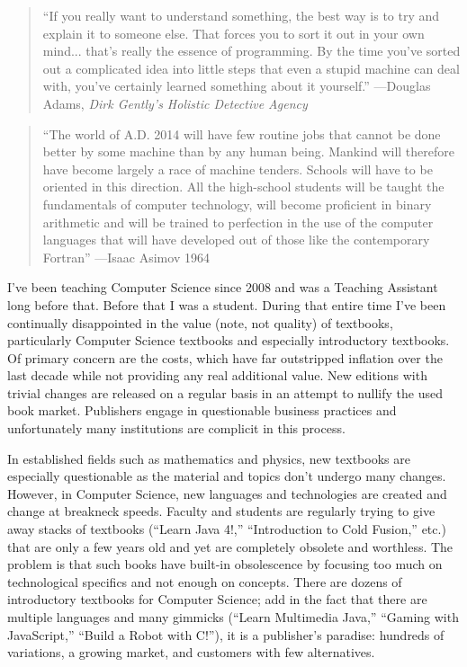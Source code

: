 
\begin{quote}
``If you really want to understand something, the best way is to try and explain it to someone else. That forces you to sort it out in your own mind... that's really the essence of programming. By the time you've sorted out a complicated idea into little steps that even a stupid machine can deal with, you've certainly learned something about it yourself.'' ---Douglas Adams, \emph{Dirk Gently's Holistic Detective Agency} \cite{Adams1987}
\end{quote}

\begin{quote}
``The world of A.D. 2014 will have few routine jobs that cannot be done better by some machine than by any human being. Mankind will therefore have become largely a race of machine tenders. Schools will have to be oriented in this direction. All the high-school students will be taught the fundamentals of computer technology, will become proficient in binary arithmetic and will be trained to perfection in the use of the computer languages that will have developed out of those like the contemporary Fortran''
---Isaac Asimov 1964
\end{quote}

I've been teaching Computer Science since 2008 and was a Teaching Assistant long before that.  Before that
I was a student.  During that entire time I've been continually disappointed in the value (note, not quality) of
textbooks, particularly Computer Science textbooks and especially introductory textbooks.  Of primary concern
are the costs, which have far outstripped inflation over the last decade \cite{GAO:2013} while not providing any 
real additional value.  New editions with trivial changes are released on a regular basis in an attempt to
nullify the used book market.  Publishers engage in questionable business practices and unfortunately many
institutions are complicit in this process.

In established fields such as mathematics and physics, new textbooks are especially questionable as the
material and topics don't undergo many changes.  However, in Computer Science, new languages and
technologies are created and change at breakneck speeds.  Faculty and students are regularly trying to
give away stacks of textbooks (``Learn Java 4!,'' ``Introduction to Cold Fusion,'' etc.) that are only a few
years old and yet are completely obsolete and worthless.  The problem is that such books have built-in
obsolescence by focusing too much on technological specifics and not enough on concepts.  There are
dozens of introductory textbooks for Computer Science; add in the fact that there are multiple languages
and many gimmicks (``Learn Multimedia Java,'' ``Gaming with JavaScript,'' ``Build a Robot with C!''), it is a 
publisher's paradise: hundreds of variations, a growing market, and customers with few alternatives.

